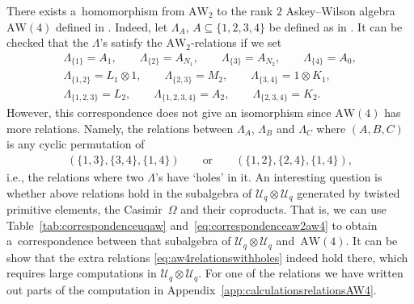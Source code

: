 \documentclass[10pt,a4paper]{amsart}
\numberwithin{equation}{section}
\newcommand{\AW}[1]{\mathrm{AW}_{#1}}
\newcommand{\Uq}{\mathcal{U}_q}
\begin{document}
\begin{Remark}\label{rem:correspondenceaw4aw2}
	There exists a~homomorphism from $\AW{2}$ to the rank $2$ Askey--Wilson algebra $\mathrm{AW}(4)$ defined in \cite{DeBie2020}. Indeed, let $\Lambda_A$, $A \subseteq \{1,2,3,4\}$ be defined as in \cite[Section~2.3]{DeBie2020}. It can be checked that the $\Lambda$'s satisfy the $\AW{2}$-relations if we set
	\begin{gather}
		\Lambda_{\{1\}}=A_1, \qquad \Lambda_{\{2\}}=A_{N_1},\qquad \Lambda_{\{3\}}=A_{N_2}, \qquad \Lambda_{\{4\}}=A_0, \nonumber\\
		\Lambda_{\{1,2\}}=L_1\otimes 1, \qquad \Lambda_{\{2,3\}} =M_2, \qquad \Lambda_{\{3,4\}} =1\otimes K_1, \label{eq:correspondenceaw2aw4}\\
		\Lambda_{\{1,2,3\}}=L_2, \qquad \Lambda_{\{1,2,3,4\}} =A_2, \qquad \Lambda_{\{2,3,4\}}=K_2.\nonumber
	\end{gather}
	However, this correspondence does not give an isomorphism since $\mathrm{AW}(4)$ has more relations. Namely, the relations between $\Lambda_A$, $\Lambda_B$ and $\Lambda_C$ where $(A,B,C)$ is any cyclic permutation of
	\begin{gather}
		(\{1,3\},\{3,4\},\{1,4\})\qquad \text{or}\qquad (\{1,2\},\{2,4\},\{1,4\})\label{eq:aw4relationswithholes},
	\end{gather}
	i.e., the relations where two $\Lambda$'s have `holes' in it. An interesting question is whether above relations hold in the subalgebra of $\Uq\otimes \Uq$ generated by twisted primitive elements, the Casimir~$\Omega$ and their coproducts. That is, we can use Table~\ref{tab:correspondenceuqaw} and~\eqref{eq:correspondenceaw2aw4} to obtain a~correspondence between that subalgebra of $\Uq\otimes\Uq$ and~$\mathrm{AW}(4)$. It can be show that the extra relations \eqref{eq:aw4relationswithholes} indeed hold there, which requires large computations in $\Uq\otimes \Uq$. For one of the relations we have written out parts of the computation in Appendix~\ref{app:calculationsrelationsAW4}.
	

\end{Remark}
\end{document}
